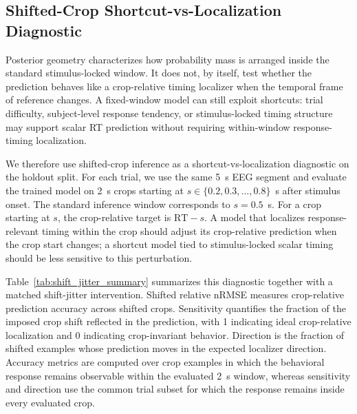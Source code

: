 \documentclass[12pt]{article}
\begin{document}
\subsection{Shifted-Crop Shortcut-vs-Localization Diagnostic}

Posterior geometry characterizes how probability mass is arranged inside the standard stimulus-locked window. It does not, by itself, test whether the prediction behaves like a crop-relative timing localizer when the temporal frame of reference changes. A fixed-window model can still exploit shortcuts: trial difficulty, subject-level response tendency, or stimulus-locked timing structure may support scalar RT prediction without requiring within-window response-timing localization.

We therefore use shifted-crop inference as a shortcut-vs-localization diagnostic on the holdout split. For each trial, we use the same 5~s EEG segment and evaluate the trained model on 2~s crops starting at $s\in\{0.2,0.3,\dots,0.8\}$~s after stimulus onset. The standard inference window corresponds to $s=0.5$~s. For a crop starting at $s$, the crop-relative target is $\mathrm{RT}-s$. A model that localizes response-relevant timing within the crop should adjust its crop-relative prediction when the crop start changes; a shortcut model tied to stimulus-locked scalar timing should be less sensitive to this perturbation.

Table~\ref{tab:shift_jitter_summary} summarizes this diagnostic together with a matched shift-jitter intervention. Shifted relative nRMSE measures crop-relative prediction accuracy across shifted crops. Sensitivity quantifies the fraction of the imposed crop shift reflected in the prediction, with 1 indicating ideal crop-relative localization and 0 indicating crop-invariant behavior. Direction is the fraction of shifted examples whose prediction moves in the expected localizer direction. Accuracy metrics are computed over crop examples in which the behavioral response remains observable within the evaluated 2~s window, whereas sensitivity and direction use the common trial subset for which the response remains inside every evaluated crop.
\end{document}
